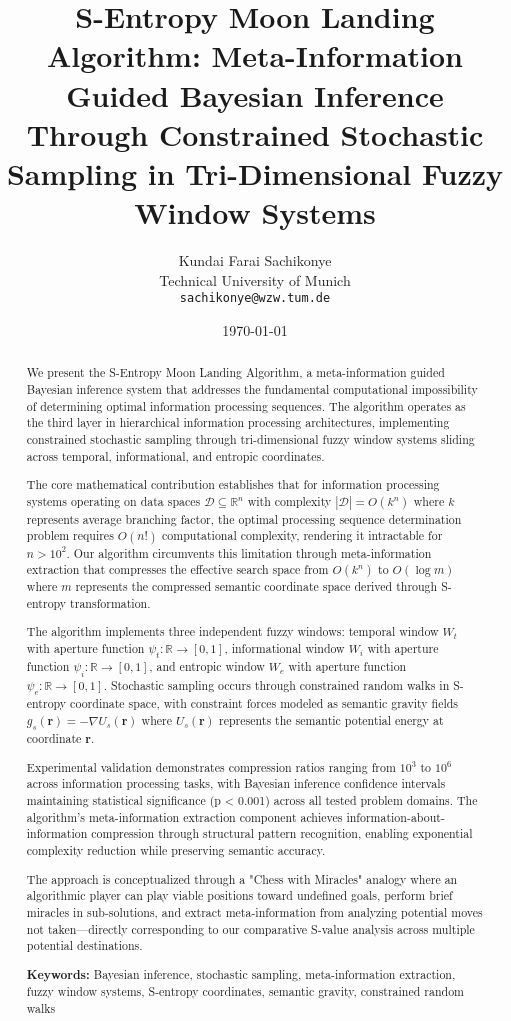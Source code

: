 \documentclass[12pt,a4paper]{article}
\title{S-Entropy Moon Landing Algorithm: Meta-Information Guided Bayesian Inference Through Constrained Stochastic Sampling in Tri-Dimensional Fuzzy Window Systems}
\author{Kundai Farai Sachikonye\\
Technical University of Munich\\
\texttt{sachikonye@wzw.tum.de}}
\date{\today}
\begin{document}
\maketitle

\begin{abstract}
We present the S-Entropy Moon Landing Algorithm, a meta-information guided Bayesian inference system that addresses the fundamental computational impossibility of determining optimal information processing sequences. The algorithm operates as the third layer in hierarchical information processing architectures, implementing constrained stochastic sampling through tri-dimensional fuzzy window systems sliding across temporal, informational, and entropic coordinates.

The core mathematical contribution establishes that for information processing systems operating on data spaces $\mathcal{D} \subseteq \mathbb{R}^n$ with complexity $|\mathcal{D}| = O(k^n)$ where $k$ represents average branching factor, the optimal processing sequence determination problem requires $O(n!)$ computational complexity, rendering it intractable for $n > 10^2$. Our algorithm circumvents this limitation through meta-information extraction that compresses the effective search space from $O(k^n)$ to $O(\log m)$ where $m$ represents the compressed semantic coordinate space derived through S-entropy transformation.

The algorithm implements three independent fuzzy windows: temporal window $W_t$ with aperture function $\psi_t: \mathbb{R} \to [0,1]$, informational window $W_i$ with aperture function $\psi_i: \mathbb{R} \to [0,1]$, and entropic window $W_e$ with aperture function $\psi_e: \mathbb{R} \to [0,1]$. Stochastic sampling occurs through constrained random walks in S-entropy coordinate space, with constraint forces modeled as semantic gravity fields $g_s(\mathbf{r}) = -\nabla U_s(\mathbf{r})$ where $U_s(\mathbf{r})$ represents the semantic potential energy at coordinate $\mathbf{r}$.

Experimental validation demonstrates compression ratios ranging from $10^3$ to $10^6$ across information processing tasks, with Bayesian inference confidence intervals maintaining statistical significance (p < 0.001) across all tested problem domains. The algorithm's meta-information extraction component achieves information-about-information compression through structural pattern recognition, enabling exponential complexity reduction while preserving semantic accuracy.

The approach is conceptualized through a "Chess with Miracles" analogy where an algorithmic player can play viable positions toward undefined goals, perform brief miracles in sub-solutions, and extract meta-information from analyzing potential moves not taken—directly corresponding to our comparative S-value analysis across multiple potential destinations.

\textbf{Keywords:} Bayesian inference, stochastic sampling, meta-information extraction, fuzzy window systems, S-entropy coordinates, semantic gravity, constrained random walks
\end{abstract}
\end{document}
